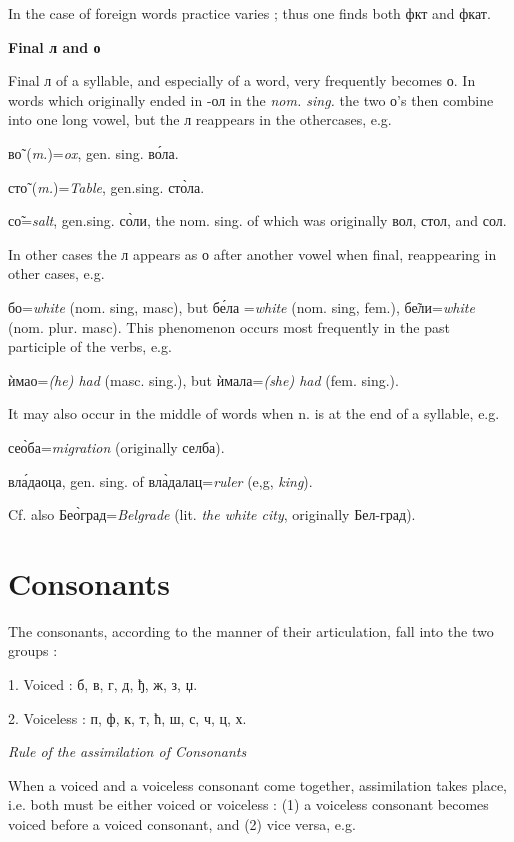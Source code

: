 In the case of foreign words practice varies ; thus one finds both
фкт and фкат. 

\smallskip
{\hfill \large \textbf{Final л and о} \hfill}

Final л of a syllable, and especially of a word, very frequently becomes о.
In words which originally ended in -ол in the \emph{nom. sing.} the two о's
then combine into one long vowel, but the л reappears in the othercases, e.g.

в\~{о} (\emph{m.})=\emph{ox}, gen. sing. в\'{о}ла. 

ст\~{о} (\emph{m.})=\emph{Table}, gen.sing. ст\`{о}ла.

с\~{о}=\emph{salt}, gen.sing. с\`{о}ли, the nom. sing. of which was originally
вол, стол, and сол.

In other cases the л appears as о after another vowel when
final, reappearing in other cases, e.g.

бо=\emph{white} (nom. sing, masc), but б\'{е}ла
=\emph{white} (nom. sing, fem.), б\~{е}ли=\emph{white} (nom. plur. masc).
This phenomenon occurs most frequently in the past participle of the verbs, e.g.

\`{и}мао=\emph{(he) had} (masc. sing.), but \`{и}мала=\emph{(she) had} (fem. sing.). 

\pagebreak

It may also occur in the middle of words when n. is at the end
of a syllable, e.g.

се\`{о}ба=\emph{migration} (originally селба).

вл\'{а}даоца, gen. sing. of вл\`{а}далац=\emph{ruler} (e,g, \emph{king}).

Cf. also Бе\`{о}град=\emph{Belgrade} (lit. \emph{the white city}, originally Бел-град).

\section{Consonants}

The consonants, according to the manner of their
articulation, fall into the two groups :

1. Voiced : б, в, г, д, ђ, ж, з, џ.

2. Voiceless : п, ф, к, т, ћ, ш, с, ч, ц, х.

\smallskip
{\hfill \textit{Rule of the assimilation of Consonants} \hfill}

When a voiced and a voiceless consonant come together,\linebreak
assimilation takes place, i.e. both must be either voiced \linebreak 
or voiceless : (1) a voiceless consonant becomes voiced before
a voiced consonant, and (2) vice versa, e.g.

